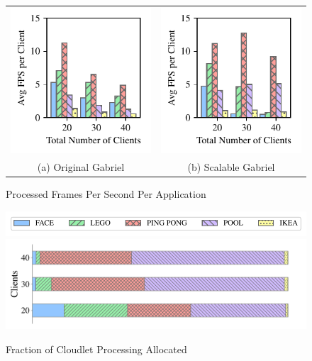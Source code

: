 \begin{figure}[]
  \begin{center}
    \begin{tabular}{c@{}c}
      \includegraphics[width=.5\linewidth]{FIGS/fig-eval-fps-baseline.pdf}
                             & \includegraphics[width=.5\linewidth]{FIGS/fig-eval-fps-cpushares.pdf} \\
      {(a) Original Gabriel} & {(b) Scalable Gabriel}
    \end{tabular}
  \end{center}
  \caption{Processed Frames Per Second Per Application}
  \label{fig:frame-fps}
\end{figure}

\begin{figure}[]
  \begin{center}
    \includegraphics[width=.7\linewidth]{FIGS/fig-alloc-latency-legend.pdf}
    \includegraphics[width=.7\linewidth]{FIGS/fig-sec6-latency-allocation.pdf}
  \end{center}
  \vspace{-0.1in}
  \caption{Fraction of Cloudlet Processing Allocated}
  \label{figs:resource-allocated}
\end{figure}

